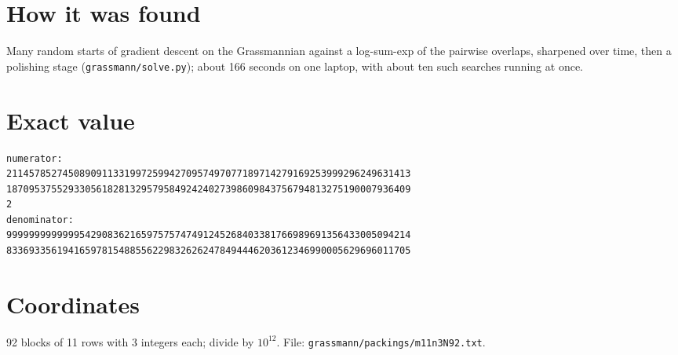\documentclass[11pt,a4paper]{article}
\begin{document}
\section{How it was found}
Many random starts of gradient descent on the Grassmannian against a log-sum-exp of the pairwise overlaps, sharpened over time, then a polishing stage (\texttt{grassmann/solve.py}); about 166 seconds on one laptop, with about ten such searches running at once.


\appendix
\section{Exact value}
{\small
\begin{verbatim}
numerator:
211457852745089091133199725994270957497077189714279169253999296249631413
187095375529330561828132957958492424027398609843756794813275190007936409
2
denominator:
999999999999954290836216597575747491245268403381766989691356433005094214
833693356194165978154885562298326262478494446203612346990005629696011705
\end{verbatim}}

\section{Coordinates}
92 blocks of 11 rows with 3 integers each; divide by $10^{12}$. File: \texttt{grassmann/packings/m11n3N92.txt}.
{\tiny
\begin{multicols}{3}
\end{multicols}}
\end{document}
